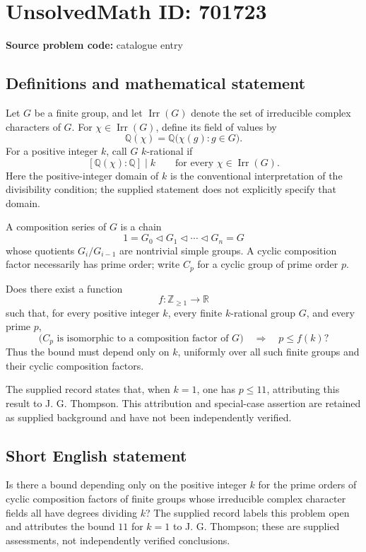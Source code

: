 \documentclass[11pt]{article}
\newcommand{\Z}{\mathbb{Z}}
\newcommand{\Q}{\mathbb{Q}}
\newcommand{\R}{\mathbb{R}}
\begin{document}
\section*{UnsolvedMath ID: 701723}
\textbf{Source problem code:} catalogue entry
\subsection{Definitions and mathematical statement}
Let \(G\) be a finite group, and let \(\operatorname{Irr}(G)\) denote the set of irreducible complex characters of \(G\). For \(\chi\in\operatorname{Irr}(G)\), define its field of values by
\[
\Q(\chi)=\Q\bigl(\chi(g):g\in G\bigr).
\]
For a positive integer \(k\), call \(G\) \(k\)-rational if
\[
[\Q(\chi):\Q]\mid k
\qquad\text{for every }\chi\in\operatorname{Irr}(G).
\]
Here the positive-integer domain of \(k\) is the conventional interpretation of the divisibility condition; the supplied statement does not explicitly specify that domain.

A composition series of \(G\) is a chain
\[
1=G_0\triangleleft G_1\triangleleft\cdots\triangleleft G_n=G
\]
whose quotients \(G_i/G_{i-1}\) are nontrivial simple groups. A cyclic composition factor necessarily has prime order; write \(C_p\) for a cyclic group of prime order \(p\).

Does there exist a function
\[
f:\Z_{\geq 1}\longrightarrow\R
\]
such that, for every positive integer \(k\), every finite \(k\)-rational group \(G\), and every prime \(p\),
\[
\bigl(C_p\text{ is isomorphic to a composition factor of }G\bigr)
\quad\Longrightarrow\quad p\leq f(k)?
\]
Thus the bound must depend only on \(k\), uniformly over all such finite groups and their cyclic composition factors.

The supplied record states that, when \(k=1\), one has \(p\leq 11\), attributing this result to J. G. Thompson. This attribution and special-case assertion are retained as supplied background and have not been independently verified.
\subsection{Short English statement}
Is there a bound depending only on the positive integer \(k\) for the prime orders of cyclic composition factors of finite groups whose irreducible complex character fields all have degrees dividing \(k\)? The supplied record labels this problem open and attributes the bound \(11\) for \(k=1\) to J. G. Thompson; these are supplied assessments, not independently verified conclusions.
\end{document}
